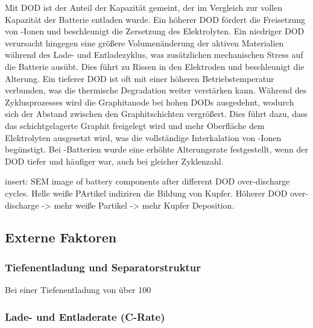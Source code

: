 Mit DOD ist der Anteil der Kapazität gemeint, der im Vergleich zur vollen Kapazität der Batterie entladen wurde. Ein höherer DOD fördert die Freisetzung von -Ionen und beschleunigt die Zersetzung des Elektrolyten. Ein niedriger DOD verursacht hingegen eine größere Volumenänderung der aktiven Materialien während des Lade- und Entladezyklus, was zusätzlichen mechanischen Stress auf die Batterie ausübt. Dies führt zu Rissen in den Elektroden und beschleunigt die Alterung. Ein tieferer DOD ist oft mit einer höheren Betriebstemperatur verbunden, was die thermische Degradation weiter verstärken kann. Während des Zyklusprozesses wird die Graphitanode bei hohen DODs ausgedehnt, wodurch sich der Abstand zwischen den Graphitschichten vergrößert. Dies führt dazu, dass das schichtgelagerte Graphit freigelegt wird und mehr Oberfläche dem Elektrolyten ausgesetzt wird, was die vollständige Interkalation von -Ionen begünstigt. Bei -Batterien wurde eine erhöhte Alterungsrate festgestellt, wenn der DOD tiefer und häufiger war, auch bei gleicher Zyklenzahl.


insert: SEM image of battery components after different DOD over-discharge cycles. Helle weiße PArtikel indiziren die Bildung von Kupfer. Höherer DOD over-discharge -> mehr weiße Partikel -> mehr Kupfer Deposition.

\subsection{Externe Faktoren}

\subsubsection{Tiefenentladung und Separatorstruktur}

Bei einer Tiefenentladung von über 100 %

\subsubsection{Lade- und Entladerate (C-Rate)}

